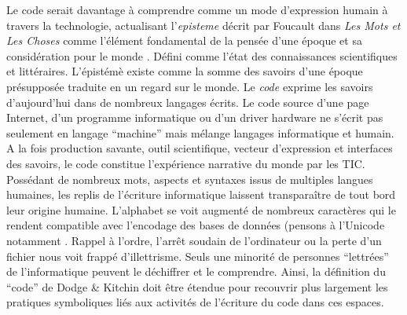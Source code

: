Le code serait davantage à comprendre comme un mode d’expression humain à travers la technologie, actualisant l’\textit{episteme} décrit par Foucault dans \textit{Les Mots et Les Choses} comme l’élément fondamental de la pensée d’une époque et sa considération pour le monde \citep{Foucault1996}. Défini comme l’état des connaissances scientifiques et littéraires. L'épistémè existe comme la somme des savoirs d’une époque présupposée traduite en un regard sur le monde. Le \textit{code} exprime les savoirs d’aujourd’hui dans de nombreux langages écrits. Le code source d’une page Internet, d’un programme informatique ou d’un driver hardware ne s’écrit pas seulement en langage “machine” mais mélange langages informatique et humain. A la fois production savante, outil scientifique, vecteur d’expression et interfaces des savoirs, le code constitue l’expérience narrative du monde par les TIC. Possédant de nombreux mots, aspects et syntaxes issus de multiples langues humaines, les replis de l’écriture informatique laissent transparaître de tout bord leur origine humaine. L'alphabet se voit augmenté de nombreux caractères qui le rendent compatible avec l’encodage des bases de données (pensons à l’Unicode notamment \citep{Guichard2014}. Rappel à l'ordre, l'arrêt soudain de l’ordinateur ou la perte d’un fichier nous voit frappé d’illettrisme. Seuls une minorité de personnes “lettrées” de l’informatique peuvent le déchiffrer et le comprendre. Ainsi, la définition du “code” de Dodge \&  Kitchin doit être étendue pour recouvrir plus largement les pratiques symboliques liés aux activités de l’écriture du code dans ces espaces.


